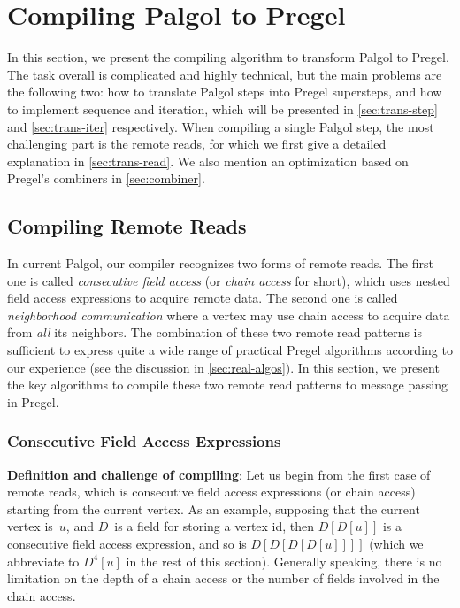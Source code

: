 \documentclass{sokendai_thesis} %
\begin{document}
\chapter{Compiling Palgol to Pregel}
\label{sec:compilation}

In this section, we present the compiling algorithm to transform Palgol to Pregel.
The task overall is complicated and highly technical, but the main problems are the following two: how to translate Palgol steps into Pregel supersteps, and how to implement sequence and iteration, which will be presented in \autoref{sec:trans-step} and \autoref{sec:trans-iter} respectively.
When compiling a single Palgol step, the most challenging part is the remote reads, for which we first give a detailed explanation in \autoref{sec:trans-read}.
We also mention an optimization based on Pregel's combiners in \autoref{sec:combiner}.

\section{Compiling Remote Reads}
\label{sec:trans-read}

In current Palgol, our compiler recognizes two forms of remote reads.
The first one is called \emph{consecutive field access} (or \emph{chain access} for short), which uses nested field access expressions to acquire remote data.
The second one is called \emph{neighborhood communication} where a vertex may use chain access to acquire data from \emph{all} its neighbors.
The combination of these two remote read patterns is sufficient to express quite a wide range of practical Pregel algorithms according to our experience (see the discussion in \autoref{sec:real-algos}).
In this section, we present the key algorithms to compile these two remote read patterns to message passing in Pregel.

\subsection{Consecutive Field Access Expressions}
\label{sec:consecutive}

\textbf{Definition and challenge of compiling}:
Let us begin from the first case of remote reads, which is consecutive field access expressions (or chain access) starting from the current vertex.
As an example, supposing that the current vertex is~$u$, and $D$~is a field for storing a vertex id, then $D[D[u]]$ is a consecutive field access expression, and so is $D[D[D[D[u]]]]$ (which we abbreviate to $D^4[u]$ in the rest of this section).
Generally speaking, there is no limitation on the depth of a chain access or the number of fields involved in the chain access.
\end{document}
